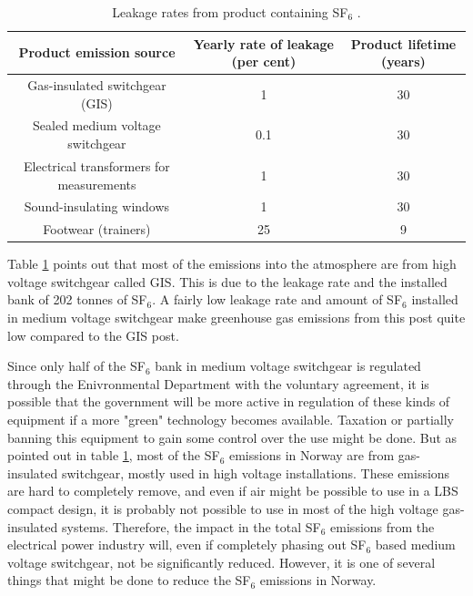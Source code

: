 \documentclass[10pt,a4paper,twoside]{article}
\begin{document}
\begin{table}[H]
\center
\caption{Leakage rates from product containing SF$_6$ \cite{bib:StatSF6}.}
\begin{tabular}{|c|c|c|}
\hline 
\textbf{Product emission source}
 & \textbf{Yearly rate of
leakage (per cent)}
 & \textbf{Product lifetime
(years)}
 \\ 
\hline 
Gas-insulated switchgear (GIS)
 & 1 & 30 \\ 
\hline 
Sealed medium voltage switchgear
 & 0.1 & 30 \\ 
\hline 
Electrical transformers for
measurements
 & 1 & 30 \\ 
\hline 
Sound-insulating windows
 & 1 & 30 \\ 
\hline 
Footwear (trainers)
 & 25 & 9 \\ 
\hline 
\end{tabular} 
\label{tab:leakageRatesProdSF6}
\end{table}

Table \ref{tab:leakageRatesProdSF6} points out that most of the emissions into the atmosphere are from high voltage switchgear called GIS. This is due to the leakage rate and the installed bank of 202 tonnes of SF$_6$. A fairly low leakage rate and amount of SF$_6$ installed in medium voltage switchgear make greenhouse gas emissions from this post quite low compared to the GIS post.

Since only half of the SF$_6$ bank in medium voltage switchgear is regulated through the Enivronmental Department with the voluntary agreement, it is possible that the government will be more active in regulation of these kinds of equipment if a more "green" technology becomes available. Taxation or partially banning this equipment to gain some control over the use might be done. But as pointed out in table \ref{tab:leakageRatesProdSF6}, most of the SF$_6$ emissions in Norway are from gas-insulated switchgear, mostly used in high voltage installations. These emissions are hard to completely remove, and even if air might be possible to use in a LBS compact design, it is probably not possible to use in most of the high voltage gas-insulated systems. Therefore, the impact in the total SF$_6$ emissions from the electrical power industry will, even if completely phasing out SF$_6$ based medium voltage switchgear, not be significantly reduced. However, it is one of several things that might be done to reduce the SF$_6$ emissions in Norway.
\end{document}
